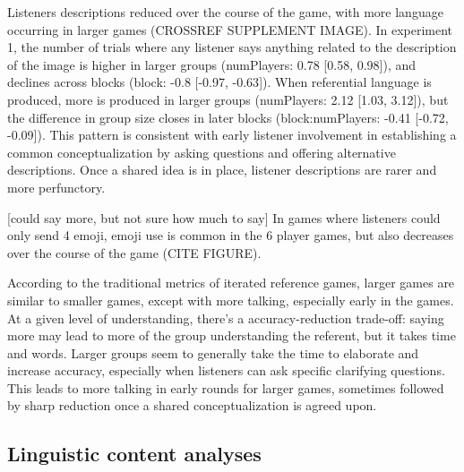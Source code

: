 \documentclass[
  english,
  a4paper,
]{article}
\begin{document}
Listeners descriptions reduced over the course of the game, with more language occurring in larger games (CROSSREF SUPPLEMENT IMAGE). In experiment 1, the number of trials where any listener says anything related to the description of the image is higher in larger groups (numPlayers: 0.78 {[}0.58, 0.98{]}), and declines across blocks (block: -0.8 {[}-0.97, -0.63{]}). When referential language is produced, more is produced in larger groups (numPlayers: 2.12 {[}1.03, 3.12{]}), but the difference in group size closes in later blocks (block:numPlayers: -0.41 {[}-0.72, -0.09{]}). This pattern is consistent with early listener involvement in establishing a common conceptualization by asking questions and offering alternative descriptions. Once a shared idea is in place, listener descriptions are rarer and more perfunctory.

{[}could say more, but not sure how much to say{]} In games where listeners could only send 4 emoji, emoji use is common in the 6 player games, but also decreases over the course of the game (CITE FIGURE).

According to the traditional metrics of iterated reference games, larger games are similar to smaller games, except with more talking, especially early in the games. At a given level of understanding, there's a accuracy-reduction trade-off: saying more may lead to more of the group understanding the referent, but it takes time and words. Larger groups seem to generally take the time to elaborate and increase accuracy, especially when listeners can ask specific clarifying questions. This leads to more talking in early rounds for larger games, sometimes followed by sharp reduction once a shared conceptualization is agreed upon.

\hypertarget{linguistic-content-analyses}{%
\subsection{Linguistic content analyses}\label{linguistic-content-analyses}}
\end{document}
